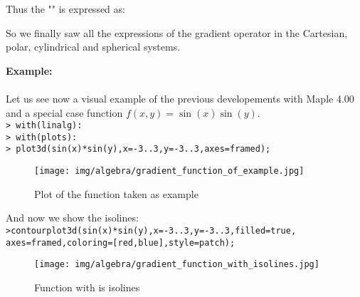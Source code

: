 	Thus the "" is expressed as:
	 
	So we finally saw all the expressions of the gradient operator in the Cartesian, polar, cylindrical and spherical systems.
	
	\begin{tcolorbox}[colframe=black,colback=white,sharp corners]
	\textbf{{\Large {}}Example:}\\\\
	Let us see now a visual example of the previous developements with Maple 4.00 and a special case function $f(x,y)=\sin(x)\sin(y)$.\\
	
	\texttt{> with(linalg):\\
	> with(plots):\\
	> plot3d(sin(x)*sin(y),x=-3..3,y=-3..3,axes=framed);}\\
	\begin{figure}[H]
		\centering
		\texttt{[image: img/algebra/gradient\_function\_of\_example.jpg]}
		\caption[]{Plot of the function taken as example}
	\end{figure}
	And now we show the isolines:\\
	
	\texttt{>contourplot3d(sin(x)*sin(y),x=-3..3,y=-3..3,filled=true,\\
	axes=framed,coloring=[red,blue],style=patch);}
	\begin{figure}[H]
		\centering
		\texttt{[image: img/algebra/gradient\_function\_with\_isolines.jpg]}
		\caption[]{Function with is isolines}
	\end{figure}
	\end{tcolorbox}
	

